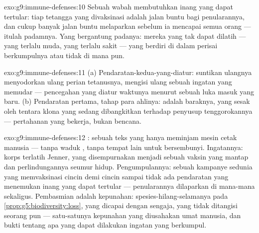 \begin{solution}{exo:g9:immune-defenses:10}
Sebuah wabah membutuhkan inang yang dapat tertular: tiap
tetangga yang divaksinasi adalah jalan buntu bagi
penularannya, dan cukup banyak jalan buntu melaparkan
 sebelum ia mencapai semua orang --- itulah
padamnya. Yang bergantung padanya: mereka yang tak dapat
dilatih --- yang terlalu muda, yang terlalu sakit --- yang
berdiri di dalam perisai berkumpulnya atau tidak di mana pun.
\end{solution}

\begin{solution}{exo:g9:immune-defenses:11}
(a) Pendaratan-kedua-yang-diatur: suntikan ulangnya
menyodorkan ulang perian tetanusnya, mengisi ulang sebuah
ingatan yang memudar --- pencegahan yang diatur waktunya
menurut sebuah luka masuk yang baru. (b) Pendaratan pertama,
tahap para ahlinya:  adalah baraknya, yang sesak
oleh tentara klona yang sedang dibangkitkan terhadap
penyusup tenggorokannya --- pertahanan yang bekerja, bukan
bencana.
\end{solution}

\begin{solution}{exo:g9:immune-defenses:12}
: sebuah teks yang hanya meminjam mesin cetak
manusia --- tanpa waduk , tanpa tempat lain untuk
bersembunyi. Ingatannya: korps terlatih Jenner, yang
disempurnakan menjadi sebuah vaksin yang mantap dan
perlindungannya seumur hidup. Pengumpulannya: sebuah
kampanye sedunia yang memvaksinasi cincin demi cincin sampai
tidak ada pendaratan yang menemukan inang yang dapat
tertular --- penularannya dilaparkan di mana-mana sekaligus.
Pembasmian adalah kepunahan: spesies-hilang-selamanya pada
\cref{prop:g5:biodiversity:loss}, yang dicapai dengan
sengaja, yang tidak ditangisi seorang pun --- satu-satunya
kepunahan yang diusahakan umat manusia, dan bukti tentang
apa yang dapat dilakukan ingatan yang berkumpul.
\end{solution}

